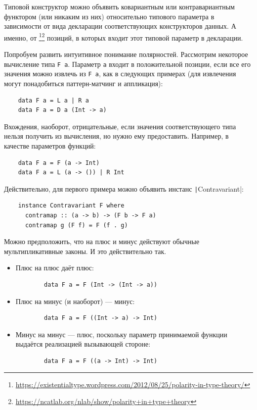 Типовой конструктор можно объявить ковариантным или контравариантным функтором (или никаким из них) относительно типового параметра в зависимости от вида декларации соответствующих конструкторов данных.
А именно, от \footnote{\url{https://existentialtype.wordpress.com/2012/08/25/polarity-in-type-theory/}}\footnote{\url{https://ncatlab.org/nlab/show/polarity+in+type+theory}} позиций, в которых входит этот типовой параметр в декларации.

Попробуем развить интуитивное понимание полярностей.
Рассмотрим некоторое вычисление типа \texttt{F a}.
Параметр \texttt{a} входит в положительной позиции, если все его значения можно извлечь из \texttt{F a}, как в следующих примерах (для извлечения могут понадобиться паттерн-матчинг и аппликация):
\begin{verbatim}
    data F a = L a | R a
    data F a = D a (Int -> a)
\end{verbatim}

Вхождения, наоборот, отрицательные, если значения соответствующего типа нельзя получить из вычисления, но нужно ему предоставить.
Например, в качестве параметров функций:
\begin{verbatim}
    data F a = F (a -> Int)
    data F a = L (a -> ()) | R Int
\end{verbatim}
Действительно, для первого примера можно объявить инстанс \texttt|Contravariant|:
\begin{verbatim}
    instance Contravariant F where
      contramap :: (a -> b) -> (F b -> F a)
      contramap g (F f) = F (f . g)
\end{verbatim}

Можно предположить, что на плюс и минус действуют обычные мультипликативные законы.
И это действительно так.
\begin{itemize}
    \item Плюс на плюс даёт плюс:
    \begin{verbatim}
        data F a = F (Int -> (Int -> a))
    \end{verbatim}
    \item Плюс на минус (и наоборот) --- минус:
    \begin{verbatim}
        data F a = F ((Int -> a) -> Int)
    \end{verbatim}
    \item Минус на минус --- плюс, поскольку параметр принимаемой функции выдаётся реализацией вызывающей стороне:
    \begin{verbatim}
        data F a = F ((a -> Int) -> Int)
    \end{verbatim}
\end{itemize}


